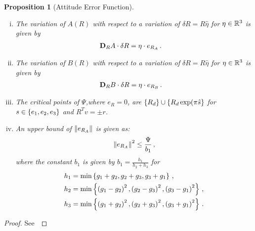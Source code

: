 \documentclass[letterpaper, 10 pt, conference]{ieeeconf}  %
\newtheorem{prop}{Proposition}
\begin{document}
\begin{prop}[Attitude Error Function]
\begin{enumerate}[(i)]
	\begin{align}
		\dirDiff{\Psi}{R} &= \dirDiff{A}{R} \,  B(R) + A \,  \dirDiff{B}{R} \, .
	\end{align}
	\item \label{item:prop_era}The variation of \( A(R) \) with respect to a variation of \( \delta R = R \hat{\eta} \) for \( \eta \in \mathbb{R}^3 \) is given by
	\begin{align}
		\mathbf{D}_{R} A \cdot \delta R &= \eta \cdot e_{R_A} \, .
	\end{align}
	\item \label{item:prop_erb} The variation of \( B(R) \) with respect to a variation of \( \delta R = R \hat{\eta} \) for \( \eta \in \mathbb{R}^3 \) is given by
	\begin{align}
		\mathbf{D}_{R} B \cdot \delta R &= \eta \cdot e_{R_{B}} \, .
	\end{align}
	\item \label{item:prop_crit}The critical points of \( \Psi \),where \( e_R = 0\), are \( \left\{ R_d \right\} \cup \left\{ R_d \exp(\pi \hat{s} \right\} \) for \( s \in \left\{ e_1, e_2, e_3 \right\} \) and \( R^T v = \pm r \).
	\item \label{item:prop_era_upbound}An upper bound of \( \left\| e_{R_A} \right\| \) is given as:
	\begin{align}
		\left\| e_{R_A} \right\|^2 \leq \frac{\Psi}{b_1} \, , \label{eqn:psi_lower_bound}
	\end{align}
	where the constant \( b_1 \) is given by \( b_1 = \frac{h_1}{h_2 + h_3} \) for 
	\begin{align*}
		h_1 &= \min\left\{ g_1 + g_2, g_2 + g_3 , g_3 + g_1 \right\} \, ,\\
		h_2 &= \min\left\{ \left( g_1 -g_2 \right)^2,\left( g_2 -g_3 \right)^2 , \left( g_3 -g_1 \right)^2 \right\} \, ,\\
		h_3 &= \min\left\{ \left( g_1 + g_2 \right)^2, \left( g_2 + g_3 \right)^2 , \left( g_3 + g_1 \right)^2 \right\} \, .				
	\end{align*}
\end{enumerate}
\end{prop}
\begin{proof}
See~
\end{proof}
\end{document}
